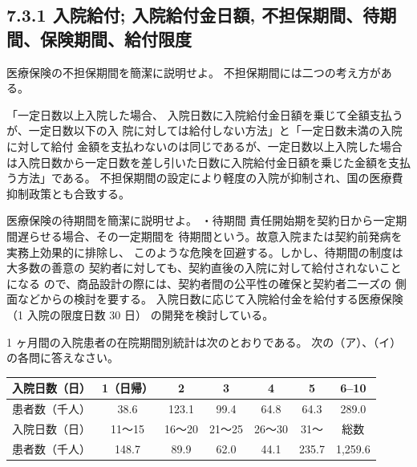 \documentclass[report,gutter=10mm,fore-edge=10mm,uplatex,dvipdfmx]{jlreq}
\begin{document}
\subsection{7.3.1 入院給付; 入院給付金日額, 不担保期間、待期間、保険期間、給付限度}
医療保険の不担保期間を簡潔に説明せよ。
不担保期間には二つの考え方がある。

「一定日数以上入院した場合、
入院日数に入院給付金日額を乗じて全額支払うが、一定日数以下の入
院に対しては給付しない方法」と「一定日数未満の入院に対して給付
金額を支払わないのは同じであるが、一定日数以上入院した場合は入院日数から一定日数を差し引いた日数に入院給付金日額を乗じた金額を支払う方法」である。
不担保期間の設定により軽度の入院が抑制され、国の医療費抑制政策とも合致する。

医療保険の待期間を簡潔に説明せよ。
・待期間
責任開始期を契約日から一定期間遅らせる場合、その一定期間を
待期間という。故意入院または契約前発病を実務上効果的に排除し、
このような危険を回避する。しかし、待期間の制度は大多数の善意の
契約者に対しても、契約直後の入院に対して給付されないことになる
ので、商品設計の際には、契約者間の公平性の確保と契約者二一ズの
側面などからの検討を要する。
入院日数に応じて入院給付金を給付する医療保険
（1 入院の限度日数 30 日）
の開発を検討している。

1 ヶ月間の入院患者の在院期間別統計は次のとおりである。
次の（ア）、（イ）の各問に答えなさい。
\begin{tabular}[t]{|c|c|c|c|c|c|c|}
\hline 入院日数（日）& 1（日帰）& 2&3 & 4&5 &6--10 \\
 \hline 患者数（千人） &38.6 &123.1 &99.4 &64.8 &64.3 &289.0 \\ \hline
入院日数（日） & 11～15& 16～20& 21～25& 26～30&31～ & 総数\\ \hline
患者数（千人）
 & 148.7
& 89.9& 62.0& 44.1& 235.7& 1,259.6\\ \hline
\end{tabular}
\end{document}

